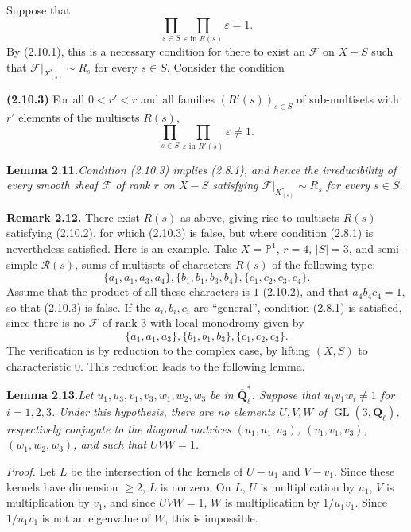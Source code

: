 \documentclass[11pt]{article}
\newcommand{\Qbl}{\overline{\mathbf{Q}}_{\ell}}
\newcommand{\GL}{\operatorname{GL}}
\newcommand{\Pone}{\mathbb{P}^{1}}
\newcommand{\Rcal}{\mathcal{R}}
\newcommand{\Fcal}{\mathcal{F}}
\newcommand{\para}[1]{\medskip\noindent\textbf{#1}\enspace}
\begin{document}
Suppose that
\begin{equation}
\prod_{s\in S}\prod_{\varepsilon\text{ in }R(s)}\varepsilon=1.
\tag{2.10.2}
\end{equation}
By (2.10.1), this is a necessary condition for there to exist an \(\Fcal\) on \(X-S\) such that \(\Fcal|_{X^*_{(s)}}\sim R_s\) for every \(s\in S\). Consider the condition

\para{(2.10.3)} For all \(0<r'<r\) and all families \((R'(s))_{s\in S}\) of sub-multisets with \(r'\) elements of the multisets \(R(s)\),
\[
\prod_{s\in S}\prod_{\varepsilon\text{ in }R'(s)}\varepsilon\ne 1.
\]

\noindent\textbf{Lemma 2.11.}\quad\textit{Condition (2.10.3) implies (2.8.1), and hence the irreducibility of every smooth sheaf \(\Fcal\) of rank \(r\) on \(X-S\) satisfying \(\Fcal|_{X^*_{(s)}}\sim R_s\) for every \(s\in S\).}

\para{Remark 2.12.} There exist \(R(s)\) as above, giving rise to multisets \(R(s)\) satisfying (2.10.2), for which (2.10.3) is false, but where condition (2.8.1) is nevertheless satisfied. Here is an example. Take \(X=\Pone\), \(r=4\), \(|S|=3\), and semi-simple \(\Rcal(s)\), sums of multisets of characters \(R(s)\) of the following type:
\[
\{a_1,a_1,a_3,a_4\},\{b_1,b_1,b_3,b_4\},\{c_1,c_2,c_3,c_4\}.
\]
Assume that the product of all these characters is \(1\) (2.10.2), and that \(a_4b_4c_4=1\), so that (2.10.3) is false. If the \(a_i,b_i,c_i\) are ``general'', condition (2.8.1) is satisfied, since there is no \(\Fcal\) of rank \(3\) with local monodromy given by
\[
\{a_1,a_1,a_3\},\{b_1,b_1,b_3\},\{c_1,c_2,c_3\}.
\]
The verification is by reduction to the complex case, by lifting \((X,S)\) to characteristic \(0\). This reduction leads to the following lemma.

\noindent\textbf{Lemma 2.13.}\quad\textit{Let \(u_1,u_3,v_1,v_3,w_1,w_2,w_3\) be in \(\Qbl^*\). Suppose that \(u_1v_1w_i\ne 1\) for \(i=1,2,3\). Under this hypothesis, there are no elements \(U,V,W\) of \(\GL(3,\Qbl)\), respectively conjugate to the diagonal matrices \((u_1,u_1,u_3)\), \((v_1,v_1,v_3)\), \((w_1,w_2,w_3)\), and such that \(UVW=1\).}

\noindent\textit{Proof.} Let \(L\) be the intersection of the kernels of \(U-u_1\) and \(V-v_1\). Since these kernels have dimension \(\geq 2\), \(L\) is nonzero. On \(L\), \(U\) is multiplication by \(u_1\), \(V\) is multiplication by \(v_1\), and since \(UVW=1\), \(W\) is multiplication by \(1/u_1v_1\). Since \(1/u_1v_1\) is not an eigenvalue of \(W\), this is impossible.
\end{document}
